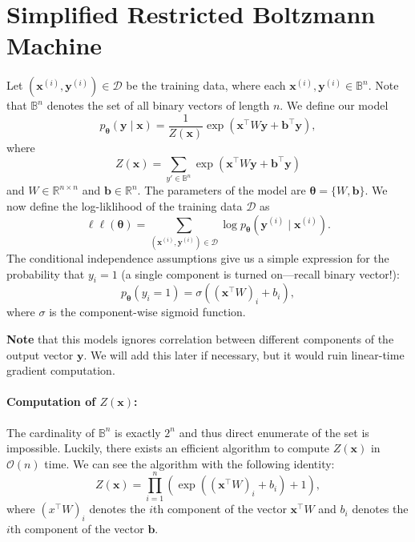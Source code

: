 \documentclass[12pt]{article}
\renewcommand{\vec}{\boldsymbol}   %
\newcommand{\x}{\vec{x}}
\newcommand{\y}{\vec{y}}
\renewcommand{\xi}{\vec{x}^{(i)}}
\newcommand{\yi}{\vec{y}^{(i)}}
\newcommand{\B}{\mathbb{B}}
\newcommand{\vtheta}{\vec{\theta}}
\begin{document}
\section{Simplified Restricted Boltzmann Machine}
Let $(\xi, \yi) \in \mathcal{D}$ be the training data, where each $\xi, \yi \in \B^n$.
Note that $\B^n$ denotes the set of all binary vectors of length $n$.
We define our model
\begin{equation}
p_{\vtheta}(\y \mid \x) = \frac{1}{Z(\x)} \exp\left(\x^{\top} W \y + \vec{b}^{\top}\y  \right),
\end{equation}
where
\begin{equation}
Z(\x) = \sum_{y' \in \mathbb{B}^n} \exp\left(\x^{\top} W \y + \vec{b}^{\top}\y  \right)
\end{equation}
and $W \in \mathbb{R}^{n \times n}$ and $\vec{b} \in \mathbb{R}^n$.
The parameters of the model are $\vtheta = \{W, \vec{b}\}$.
We now define the log-liklihood of the training data $\mathcal{D}$
as
\begin{equation}
  \ell\ell(\vtheta) = \sum_{(\xi, \yi) \in \mathcal{D}} \log p_{\vtheta}(\yi \mid \xi).
\end{equation}
The conditional independence assumptions give us a simple expression
for the probability that $y_i = 1$ (a single component is turned on---recall binary vector!):
\begin{equation}
  p_{\vtheta}(y_i = 1) = \sigma( (\x^{\top}W)_i + b_i),
\end{equation}
where $\sigma$ is the component-wise sigmoid function. 

{\bf Note} that this models ignores correlation between different
components of the output vector $\y$. We will add this later
if necessary, but it would ruin linear-time gradient computation. 



\paragraph{Computation of $Z(\x)$:} The cardinality of $\B^n$ is exactly $2^n$
and thus direct enumerate of the set is impossible. Luckily, there exists
an efficient algorithm to compute $Z(\x)$ in $\mathcal{O}(n)$ time. We can see the algorithm with the following identity:
\begin{equation}
 Z(\x) = \prod_{i=1}^{n} \left(\exp\left( (\x^{\top}W)_i + b_i \right) + 1\right),
\end{equation}
where $(x^{\top}W)_i$ denotes the $i$th component of the vector $\x^{\top}W$
and $b_i$ denotes the $i$th component of the vector $\vec{b}$.
\end{document}
